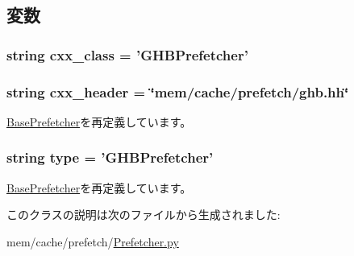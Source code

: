 \subsection{変数}
\hypertarget{classPrefetcher_1_1GHBPrefetcher_a58cd55cd4023648e138237cfc0822ae3}{
\subsubsection[{cxx\_\-class}]{\setlength{\rightskip}{0pt plus 5cm}string cxx\_\-class = '{\bf GHBPrefetcher}'}}
\label{classPrefetcher_1_1GHBPrefetcher_a58cd55cd4023648e138237cfc0822ae3}
\hypertarget{classPrefetcher_1_1GHBPrefetcher_a17da7064bc5c518791f0c891eff05fda}{
\subsubsection[{cxx\_\-header}]{\setlength{\rightskip}{0pt plus 5cm}string cxx\_\-header = \char`\"{}mem/cache/prefetch/ghb.hh\char`\"{}}}
\label{classPrefetcher_1_1GHBPrefetcher_a17da7064bc5c518791f0c891eff05fda}


\hyperlink{classPrefetcher_1_1BasePrefetcher_a17da7064bc5c518791f0c891eff05fda}{BasePrefetcher}を再定義しています。\hypertarget{classPrefetcher_1_1GHBPrefetcher_acce15679d830831b0bbe8ebc2a60b2ca}{
\subsubsection[{type}]{\setlength{\rightskip}{0pt plus 5cm}string type = '{\bf GHBPrefetcher}'}}
\label{classPrefetcher_1_1GHBPrefetcher_acce15679d830831b0bbe8ebc2a60b2ca}


\hyperlink{classPrefetcher_1_1BasePrefetcher_acce15679d830831b0bbe8ebc2a60b2ca}{BasePrefetcher}を再定義しています。

このクラスの説明は次のファイルから生成されました:\begin{DoxyCompactItemize}
\item 
mem/cache/prefetch/\hyperlink{Prefetcher_8py}{Prefetcher.py}\end{DoxyCompactItemize}
